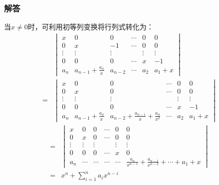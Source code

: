 \documentclass[10pt,xcolor=svgnames]{beamer} %
\begin{document}
\begin{frame}[allowframebreaks]
    \frametitle{解答}
    当\(x\neq0\)时，可利用初等列变换将行列式转化为：
    \begin{align*}
          &
        \begin{vmatrix}
            x      & 0                     & 0       & \cdots & 0      & 0      \\
            0      & x                     & -1      & \cdots & 0      & 0      \\
            \vdots & \vdots                & \vdots  &        & \vdots & \vdots \\
            0      & 0                     & 0       & \cdots & x      & -1     \\
            a_n    & a_{n-1}+\frac{a_n}{x} & a_{n-2} & \cdots & a_2    & a_1+x
        \end{vmatrix} \\
        = &
        \begin{vmatrix}
            x      & 0                     & 0                                         & \cdots & 0      & 0      \\
            0      & x                     & 0                                         & \cdots & 0      & 0      \\
            \vdots & \vdots                & \vdots                                    &        & \vdots & \vdots \\
            0      & 0                     & 0                                         & \cdots & x      & -1     \\
            a_n    & a_{n-1}+\frac{a_n}{x} & a_{n-2}+\frac{a_{n-1}}{x}+\frac{a_n}{x^2} & \cdots & a_2    & a_1+x
        \end{vmatrix}
    \end{align*}
    \begin{align*}
        = &
        \begin{vmatrix}
            x      & 0      & 0      & \cdots & 0      & 0                                                        \\
            0      & x      & 0      & \cdots & 0      & 0                                                        \\
            \vdots & \vdots & \vdots &        & \vdots & \vdots                                                   \\
            0      & 0      & 0      & \cdots & x      & 0                                                        \\
            a_n    & \cdots & \cdots & \cdots & \cdots & \frac{a_n}{x^{n-1}}+\frac{a_{n-1}}{x^{n-2}}+\cdots+a_1+x
        \end{vmatrix} \\
        = & x^n+\sum_{i=1}^{n}a_ix^{n-i}
    \end{align*}


\end{frame}
\end{document}
